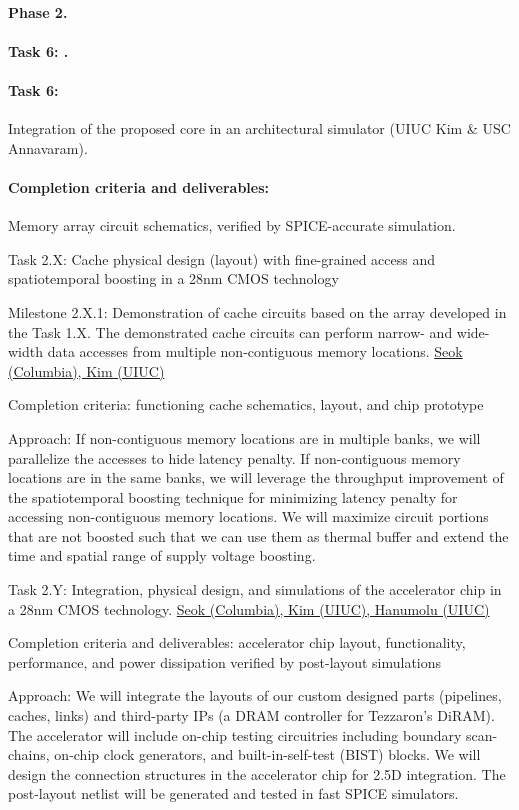 \paragraph{Phase 2.}

\noindent
\paragraph{Task 6: .}


\paragraph{Task 6:} Integration of the proposed core in an architectural simulator (UIUC Kim \& USC Annavaram).
\paragraph{Completion criteria and deliverables:} Memory array circuit schematics, verified by SPICE-accurate simulation.  

Task 2.X: Cache physical design (layout) with fine-grained access and spatiotemporal boosting in a 28nm CMOS technology

Milestone 2.X.1: Demonstration of cache circuits based on the array developed in the Task 1.X. The demonstrated cache circuits can perform narrow- and wide-width data accesses from multiple non-contiguous memory locations. \underline{Seok (Columbia), Kim (UIUC)}

   Completion criteria: functioning cache schematics, layout, and chip prototype

   Approach: If non-contiguous memory locations are in multiple banks, we will parallelize the accesses to hide latency penalty. If non-contiguous memory locations are in the same banks, we will leverage the throughput improvement of the spatiotemporal boosting technique for minimizing latency penalty for accessing non-contiguous memory locations. We will maximize circuit portions that are not boosted such that we can use them as thermal buffer and extend the time and spatial range of supply voltage boosting. 

Task 2.Y: Integration, physical design, and simulations of the accelerator chip in a 28nm CMOS technology. \underline{Seok (Columbia), Kim (UIUC), Hanumolu (UIUC)}

   Completion criteria and deliverables: accelerator chip layout, functionality, performance, and power dissipation verified by post-layout simulations

   Approach: We will integrate the layouts of our custom designed parts (pipelines, caches, links) and third-party IPs (a DRAM controller for Tezzaron's DiRAM). The accelerator will include on-chip testing circuitries including boundary scan-chains, on-chip clock generators, and built-in-self-test (BIST) blocks. We will design the connection structures in the accelerator chip for 2.5D integration. The post-layout netlist will be generated and tested in fast SPICE simulators. 

